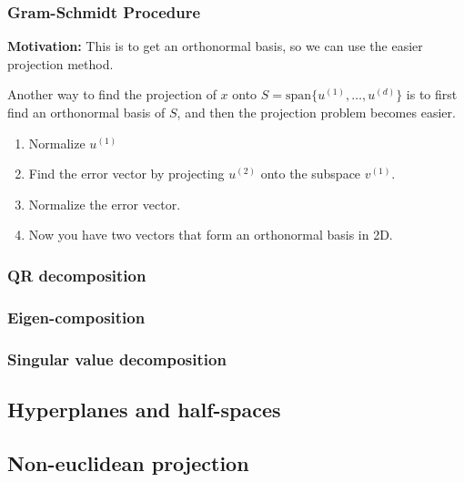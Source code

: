     \subsubsection{Gram-Schmidt Procedure}
    \textbf{Motivation:} This is to get an orthonormal basis, so we can use the easier projection method.
    \begin{intuition}
        Another way to find the projection of \(x\) onto $S = \text{span} \{u^{(1)}, \dots, u^{(d)}\}$ is to first find an orthonormal basis of \(S\), and then the projection problem becomes easier.
        \begin{enumerate}
            \item Normalize $u^{(1)}$ 
            \item Find the error vector by projecting $u^{(2)}$ onto the subspace $v^{(1)}$.
            \item Normalize the error vector.
            \item Now you have two vectors that form an orthonormal basis in 2D.
        \end{enumerate}
    \end{intuition}

    \subsubsection{QR decomposition}

    \subsubsection{Eigen-composition}

    \subsubsection{Singular value decomposition}

    
        
\subsection{Hyperplanes and half-spaces}
\subsection{Non-euclidean projection}